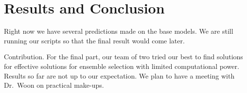 \documentclass[journal]{IEEEtran}
\begin{document}
\section{Results and Conclusion}
\label{sec:result-conclusion}
Right now we have several predictions made on the base models. We are
still running our scripts so that the final result would come later.
\par
Contribution. For the final part, our team of two tried our best to
find solutions for effective solutions for ensemble selection with
limited computational power. Results so far are not up to our
expectation. We plan to have a meeting with Dr.\ Woon on practical
make-ups. 









%
%



%
%
\end{document}
